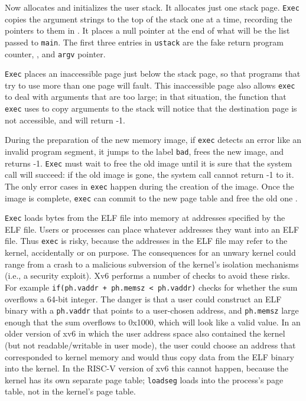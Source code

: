 Now
allocates and initializes the user stack.
It allocates just one stack page.
\lstinline{Exec}
copies the argument strings to the top of the stack
one at a time, recording the pointers to them in
.
It places a null pointer at the end of what will be the
list passed to
\lstinline{main}.
The first three entries in
\lstinline{ustack}
are the fake return program counter,
,
and
\lstinline{argv}
pointer.

\lstinline{Exec}
places an inaccessible page just below the stack page,
so that programs that try to use more than one page will fault.
This inaccessible page also allows
\lstinline{exec}
to deal with arguments that are too large;
in that situation,
the
function that
\lstinline{exec}
uses to copy arguments to the stack will notice that
the destination page is not accessible, and will
return -1.

During the preparation of the new memory image,
if
\lstinline{exec}
detects an error like an invalid program segment,
it jumps to the label
\lstinline{bad},
frees the new image,
and returns -1.
\lstinline{Exec}
must wait to free the old image until it
is sure that the system call will succeed:
if the old image is gone,
the system call cannot return -1 to it.
The only error cases in
\lstinline{exec}
happen during the creation of the image.
Once the image is complete,
\lstinline{exec}
can commit to the new page table
and free the old one
.

\lstinline{Exec}
loads bytes from the ELF file into memory at addresses specified by the ELF file.
Users or processes can place whatever addresses they want into an ELF file.
Thus
\lstinline{exec}
is risky, because the addresses in the ELF file may refer to the kernel, accidentally
or on purpose. The consequences for an unwary kernel could range from
a crash to a malicious subversion of the kernel's isolation mechanisms
(i.e., a security exploit).
Xv6 performs a number of checks to avoid these risks.
For example
\lstinline{if(ph.vaddr + ph.memsz < ph.vaddr)}
checks for whether the sum overflows a 64-bit integer.
The danger is that a user could construct an ELF binary with a
\lstinline{ph.vaddr}
that points to a user-chosen address,
and
\lstinline{ph.memsz}
large enough that the sum overflows to 0x1000, which will look like a
valid value. In an older version of xv6 in which the user address
space also contained the kernel (but not readable/writable in user
mode), the user could choose an address that corresponded to kernel
memory and would thus copy data from the ELF binary into the kernel.
In the RISC-V version of xv6 this cannot happen, because the kernel has
its own separate page table;
\lstinline{loadseg}
loads into the process's page table, not in the kernel's page table.

